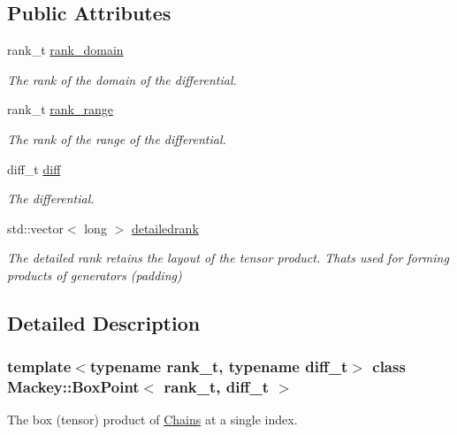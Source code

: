 \subsection*{Public Attributes}
\begin{DoxyCompactItemize}
\item 
rank\+\_\+t \hyperlink{classMackey_1_1BoxPoint_a160dd950c1ffbed689d650f4d0fadbec}{rank\+\_\+domain}
\begin{DoxyCompactList}\small\item\em The rank of the domain of the differential. \end{DoxyCompactList}\item 
rank\+\_\+t \hyperlink{classMackey_1_1BoxPoint_ab24bd5a38df100f88c8637d71dbdf608}{rank\+\_\+range}
\begin{DoxyCompactList}\small\item\em The rank of the range of the differential. \end{DoxyCompactList}\item 
diff\+\_\+t \hyperlink{classMackey_1_1BoxPoint_affefee2b62f4168ed778d96dc219ef6f}{diff}
\begin{DoxyCompactList}\small\item\em The differential. \end{DoxyCompactList}\item 
std\+::vector$<$ long $>$ \hyperlink{classMackey_1_1BoxPoint_abe386801d835d806f74ee219070d2b80}{detailedrank}
\begin{DoxyCompactList}\small\item\em The detailed rank retains the layout of the tensor product. That\textquotesingle{}s used for forming products of generators (padding) \end{DoxyCompactList}\end{DoxyCompactItemize}


\subsection{Detailed Description}
\subsubsection*{template$<$typename rank\+\_\+t, typename diff\+\_\+t$>$\newline
class Mackey\+::\+Box\+Point$<$ rank\+\_\+t, diff\+\_\+t $>$}

The box (tensor) product of \hyperlink{classMackey_1_1Chains}{Chains} at a single index. 

